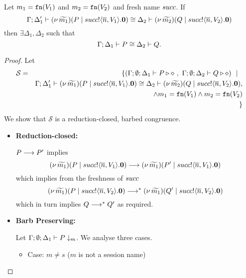 


\begin{lemma}[Extrusion]\rm
	\label{lem:extrusion}
	Let $m_1 = \mathtt{fn}(V_1)$ and $m_2 = \mathtt{fn}(V_2)$ and fresh name $succ$. 
	If 
	\[
		\Gamma; \Delta_1' \vdash (\nu\, \widetilde{m_1})(P \;|\; succ ! \langle \overline{n}, V_1 \rangle . \mathbf{0}) \cong \Delta_2 \vdash (\nu\, \widetilde{m_2})(Q \;|\; succ ! \langle \overline{n}, V_2 \rangle . \mathbf{0})
	\]
	then $\exists \Delta_1, \Delta_2$ such that
	\[
		\Gamma; \Delta_1 \vdash P \cong \Delta_2 \vdash Q.
	\]
\end{lemma}

\begin{proof}
	\noi Let
%
	\begin{eqnarray*}
		\mathcal{S}	&=&
					\{(\Gamma; \emptyset; \Delta_1 \vdash P \triangleright \diamond\ ,\ \Gamma; \emptyset; \Delta_2 \vdash Q \triangleright \diamond) \ \ |\ \  \\
				& &	\Gamma; \Delta_1' \vdash (\nu\, \widetilde{m_1})(P \;|\; succ ! \langle \overline{n}, V_1 \rangle . \mathbf{0}) \cong \Delta_2 \vdash (\nu\, \widetilde{m_2})(Q \;|\; succ ! \langle \overline{n}, V_2 \rangle . \mathbf{0}),\\
				&&   \land m_1 = \mathtt{fn}(V_1) \land m_2 = \mathtt{fn}(V_2) \\
		&&\}
	\end{eqnarray*}
%
	\noi We show that $\mathcal{S}$ is a reduction-closed, barbed congruence.


	\begin{itemize}
		\item	{\bf Reduction-closed:}

				$P \longrightarrow P'$
				implies
				\[
					(\nu\, \widetilde{m_1})(P \;|\; succ ! \langle \overline{n}, V_1 \rangle . \mathbf{0})
					\longrightarrow
					(\nu\, \widetilde{m_1})(P' \;|\; succ ! \langle \overline{n}, V_1 \rangle . \mathbf{0})
				\]
				which implies from the freshness of $succ$
				\[
					(\nu\, \widetilde{m_1})(P \;|\; succ ! \langle \overline{n}, V_2 \rangle . \mathbf{0})
					\longrightarrow^{*}
					(\nu\, \widetilde{m_1})(Q' \;|\; succ ! \langle \overline{n}, V_2 \rangle . \mathbf{0})
				\]
				which in turn implies
				$Q \longrightarrow^{*} Q'$ as required.

	\item	{\bf Barb Preserving:}

			Let $\Gamma; \emptyset; \Delta_1 \vdash P \downarrow_{m}$. We analyse three cases.
		    \begin{itemize}
				\item	Case: $m \not= s$ ($m$ is not a session name)


\end{itemize}
\end{itemize}
\end{proof}
